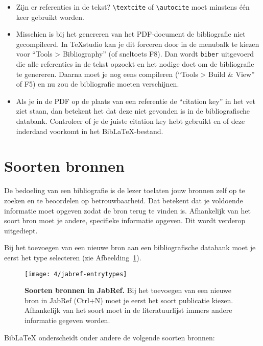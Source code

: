 \begin{itemize}
  \item Zijn er referenties in de tekst? \verb|\textcite| of \verb|\autocite| moet minstens één keer gebruikt worden.
  \item Misschien is bij het genereren van het PDF-document de bibliografie niet gecompileerd. In {\TeX}studio kan je dit forceren door in de menubalk te kiezen voor ``Tools > Bibliography'' (of sneltoets F8). Dan wordt \texttt{biber} uitgevoerd die alle referenties in de tekst opzoekt en het nodige doet om de bibliografie te genereren. Daarna moet je nog eens compileren (``Tools > Build \& View'' of F5) en nu zou de bibliografie moeten verschijnen.
  \item Als je in de PDF op de plaats van een referentie de ``citation key'' in het vet ziet staan, dan betekent het dat deze niet gevonden is in de bibliografische databank. Controleer of je de juiste citation key hebt gebruikt en of deze inderdaad voorkomt in het Bib{\LaTeX}-bestand.
\end{itemize} 

\section{Soorten bronnen}%
\label{sec:soorten_bronnen}

De bedoeling van een bibliografie is de lezer toelaten jouw bronnen zelf op te zoeken en te beoordelen op betrouwbaarheid. Dat betekent dat je voldoende informatie moet opgeven zodat de bron terug te vinden is. Afhankelijk van het soort bron moet je andere, specifieke informatie opgeven. Dit wordt verderop uitgediept.

Bij het toevoegen van een nieuwe bron aan een bibliografische databank moet je eerst het type selecteren (zie Afbeelding~\ref{fig:jabref-entrytypes}).

\begin{figure}
  \centering
  \texttt{[image: 4/jabref-entrytypes]}
  \caption[Soorten bronnen in JabRef]{\label{fig:jabref-entrytypes}\textbf{Soorten bronnen in JabRef.} Bij het toevoegen van een nieuwe bron in JabRef (Ctrl+N) moet je eerst het soort publicatie kiezen. Afhankelijk van het soort moet in de literatuurlijst immers andere informatie gegeven worden.}
\end{figure}

Bib{\LaTeX} onderscheidt onder andere de volgende soorten bronnen:

